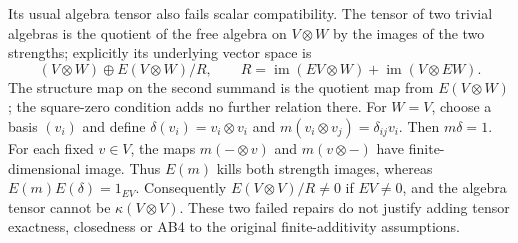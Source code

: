 Its usual algebra tensor also fails scalar compatibility.  The
tensor of two trivial algebras is the quotient of the free algebra
on \(V\otimes W\) by the images of the two strengths; explicitly
its underlying vector space is
\[
 (V\otimes W)\oplus E(V\otimes W)/R,\qquad
 R=\operatorname{im}(EV\otimes W)
       +\operatorname{im}(V\otimes EW).
\]
The structure map on the second summand is the quotient map from
\(E(V\otimes W)\); the square-zero condition adds no further
relation there.  For \(W=V\), choose a basis \((v_i)\) and define
\(\delta(v_i)=v_i\otimes v_i\) and
\(m(v_i\otimes v_j)=\delta_{ij}v_i\).  Then \(m\delta=1\).
For each fixed \(v\in V\), the maps \(m(-\otimes v)\) and
\(m(v\otimes-)\) have finite-dimensional image.  Thus \(E(m)\)
kills both strength images, whereas
\(E(m)E(\delta)=1_{EV}\).  Consequently
\(E(V\otimes V)/R\ne0\) if \(EV\ne0\), and the algebra tensor
cannot be \(\kappa(V\otimes V)\).  These two failed repairs do
not justify adding tensor exactness, closedness or AB4 to the
original finite-additivity assumptions.
